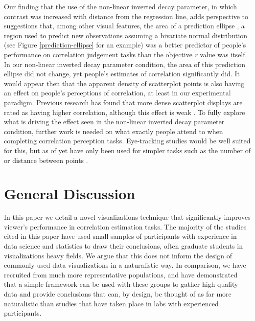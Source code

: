 \documentclass[preprint, 3p,
authoryear]{elsarticle} %
\begin{document}
Our finding that the use of the non-linear inverted decay parameter, in
which contrast was increased with distance from the regression line,
adds perspective to suggestions \citep{yang_2019} that, among other
visual features, the area of a prediction ellipse
\citep{yang_2019, cleveland_1982}, a region used to predict new
observations assuming a bivariate normal distribution (see Figure
\ref{prediction-ellipse} for an example) was a better predictor of
people's performance on correlation judgement tasks than the objective
\emph{r} value was itself. In our non-linear inverted decay parameter
condition, the area of this prediction ellipse did not change, yet
people's estimates of correlation significantly did. It would appear
then that the apparent density of scatterplot points is also having an
effect on people's perceptions of correlation, at least in our
experimental paradigm. Previous research has found that more dense
scatterplot displays are rated as having higher correlation, although
this effect is weak \citep{lauer_1989, rensink_2014}. To fully explore
what is driving the effect seen in the non-linear inverted decay
parameter condition, further work is needed on what exactly people
attend to when completing correlation perception tasks. Eye-tracking
studies would be well suited for this, but as of yet have only been used
for simpler tasks such as the number of or distance between points
\citep{netzel_2017}.

\hypertarget{general-discussion}{%
\section{General Discussion}\label{general-discussion}}

In this paper we detail a novel visualizations technique that
significantly improves viewer's performance in correlation estimation
tasks. The majority of the studies cited in this paper have used small
samples of participants with experience in data science and statistics
to draw their conclusions, often graduate students in visualizations
heavy fields. We argue that this does not inform the design of commonly
used data visualizations in a naturalistic way. In comparison, we have
recruited from much more representative populations, and have
demonstrated that a simple framework can be used with these groups to
gather high quality data and provide conclusions that can, by design, be
thought of as far more naturalistic than studies that have taken place
in labs with experienced participants.
\end{document}
